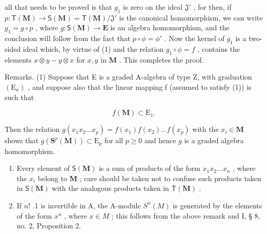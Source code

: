 all that needs to be proved is that \(g_1\) is zero on the ideal \(\mathfrak{J}'\) , for then, if \(p: \mathsf{T}(\mathbf{M}) \to \mathsf{S}(\mathbf{M}) = \mathsf{T}(\mathbf{M}) / \mathfrak{J}'\) is the canonical homomorphism, we can write \(g_1 = g \circ p\) , where \(g: \mathsf{S}(\mathbf{M}) \to \mathbf{E}\) is an algebra homomorphism, and the conclusion will follow from the fact that \(p \circ \phi = \phi'\) . Now the kernel of \(g_1\) is a two-sided ideal which, by virtue of (1) and the relation \(g_1 \circ \phi = f\) , contains the elements \(x \otimes y - y \otimes x\) for \(x, y\) in \(\mathbf{M}\) . This completes the proof.

Remarks. (1) Suppose that E is a graded A-algebra of type Z, with graduation \((\mathrm{E}_{n})\) , and suppose also that the linear mapping f (assumed to satisfy (1)) is such that

\[
f (\mathbf {M}) \subset \mathrm{E} _ {1}.\tag{2}
\]

Then the relation \(g(x_1x_2 \ldots x_p) = f(x_1)f(x_2) \ldots f(x_p)\) with the \(x_i \in \mathbf{M}\) shows that \(g(\mathbf{S}^p(\mathbf{M})) \subset \mathrm{E}_p\) for all \(p \geqslant 0\) and hence \(g\) is a graded algebra homomorphism.

\begin{enumerate}
\def\labelenumi{(\arabic{enumi})}
\setcounter{enumi}{1}
\item
  Every element of \(\mathsf{S}(\mathbf{M})\) is a sum of products of the form \(x_{1}x_{2}\ldots x_{n}\) , where the \(x_{i}\) belong to \(\mathbf{M}\) ; care should be taken not to confuse such products taken in \(\mathsf{S}(\mathbf{M})\) with the analogous products taken in \(\mathsf{T}(\mathbf{M})\) .
\item
  If \(n!\) .1 is invertible in A, the A-module \(S^n(M)\) is generated by the elements of the form \(x^n\) , where \(x \in M\) ; this follows from the above remark and I, § 8, no. 2, Proposition 2.
\end{enumerate}

